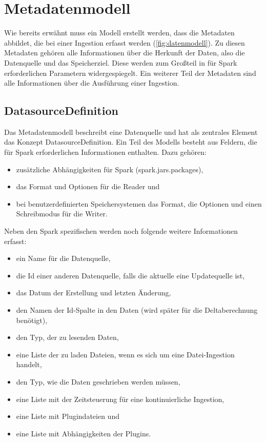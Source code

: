 \section{Metadatenmodell}

Wie bereits erwähnt muss ein Modell erstellt werden, dass die Metadaten abbildet, die bei einer Ingestion erfasst werden (\cref{fig:datenmodell}).
Zu diesen Metadaten gehören alle Informationen über die Herkunft der Daten, also die Datenquelle und das Speicherziel.
Diese werden zum Großteil in für Spark erforderlichen Parametern widergespiegelt.
Ein weiterer Teil der Metadaten sind alle Informationen über die Ausführung einer Ingestion.

\subsection{DatasourceDefinition}

Das Metadatenmodell beschreibt eine Datenquelle und hat als zentrales Element das Konzept DatasourceDefinition.
Ein Teil des Modells besteht aus Feldern, die für Spark erforderlichen Informationen enthalten.
Dazu gehören: \begin{itemize}
    \item zusätzliche Abhängigkeiten für Spark (spark.jars.packages),
    \item das Format und Optionen für die Reader und
    \item bei benutzerdefinierten Speichersystemen das Format, die Optionen und einen Schreibmodus für die Writer.
\end{itemize}
Neben den Spark spezifischen werden noch folgende weitere Informationen erfasst: \begin{itemize}
    \item ein Name für die Datenquelle,
    \item die Id einer anderen Datenquelle, falls die aktuelle eine Updatequelle ist,
    \item das Datum der Erstellung und letzten Änderung,
    \item den Namen der Id-Spalte in den Daten (wird später für die Deltaberechnung benötigt),
    \item den Typ, der zu lesenden Daten,
    \item eine Liste der zu laden Dateien, wenn es sich um eine Datei-Ingestion handelt,
    \item den Typ, wie die Daten geschrieben werden müssen,
    \item eine Liste mit der Zeitsteuerung für eine kontinuierliche Ingestion,
    \item eine Liste mit Plugindateien und
    \item eine Liste mit Abhängigkeiten der Plugins.
\end{itemize}

